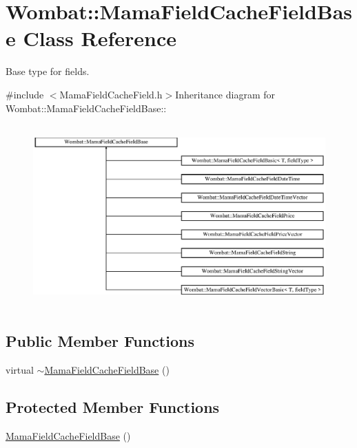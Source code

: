 \hypertarget{classWombat_1_1MamaFieldCacheFieldBase}{
\section{Wombat::MamaFieldCacheFieldBase Class Reference}
\label{classWombat_1_1MamaFieldCacheFieldBase}
}


Base type for fields.  


{\ttfamily \#include $<$MamaFieldCacheField.h$>$}Inheritance diagram for Wombat::MamaFieldCacheFieldBase::\begin{figure}[H]
\begin{center}
\leavevmode
\includegraphics[height=7.03911cm]{classWombat_1_1MamaFieldCacheFieldBase}
\end{center}
\end{figure}
\subsection*{Public Member Functions}
\begin{DoxyCompactItemize}
\item 
virtual \hyperlink{classWombat_1_1MamaFieldCacheFieldBase_a3edcd5c61a23738ee2a847d4708b41f4}{$\sim$MamaFieldCacheFieldBase} ()
\end{DoxyCompactItemize}
\subsection*{Protected Member Functions}
\begin{DoxyCompactItemize}
\item 
\hyperlink{classWombat_1_1MamaFieldCacheFieldBase_ab6fd3c2a0075d9655df2a983e9b3ea0a}{MamaFieldCacheFieldBase} ()
\end{DoxyCompactItemize}


